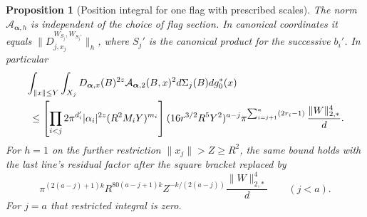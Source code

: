 \documentclass[a4paper,11pt]{article}
\newtheorem{proposition}{Proposition}[section]
\theoremstyle{definition}
\theoremstyle{remark}
\numberwithin{equation}{section}
\begin{document}
\begin{proposition}[Position integral for one flag with prescribed scales]
\leavevmode\label{prop:flagenergy923}
The norm \(\mathcal A_{\boldsymbol\alpha,h}\) is independent of
the choice of flag section. In canonical coordinates it equals
\(\|D_{j,x_j}^{W_{S_j},W_{S_j'}}\|_h\), where \(S_j'\) is the
canonical product for the successive \(b_i'\). In particular
\begin{align}
 &\int_{\|x\|\le Y}\int_{X_j}
       D_{\boldsymbol\alpha,x}(B)^{2z}
       \mathcal A_{\boldsymbol\alpha,2}(B,x)^2
                 d\Sigma_j(B)dg_0^*(x) \notag\\
 &\ \le
 \left[\prod_{i<j}2\pi^{d_i'}|\alpha_i|^{2z}(R^2 M_iY)^{m_i}\right]
 (16r^{3/2}R^5Y^2)^{a-j}
 \pi^{\sum_{i=j+1}^a(2r_i-1)}\,\frac{\|W\|_{2,*}^4}{d}.
 \label{eq:flagenergy923}
\end{align}
For \(h=1\) on the further restriction \(\|x_j\|>Z\ge R^2\),
the same bound holds with the last line's residual factor after
the square bracket replaced by
\[
 \pi^{(2(a-j)+1)k}R^{80(a-j+1)k}Z^{-k/(2(a-j))}
                          \frac{\|W\|_{2,*}^4}{d}
                       \qquad(j<a).
\]
For \(j=a\) that restricted integral is zero.
\end{proposition}
\end{document}
